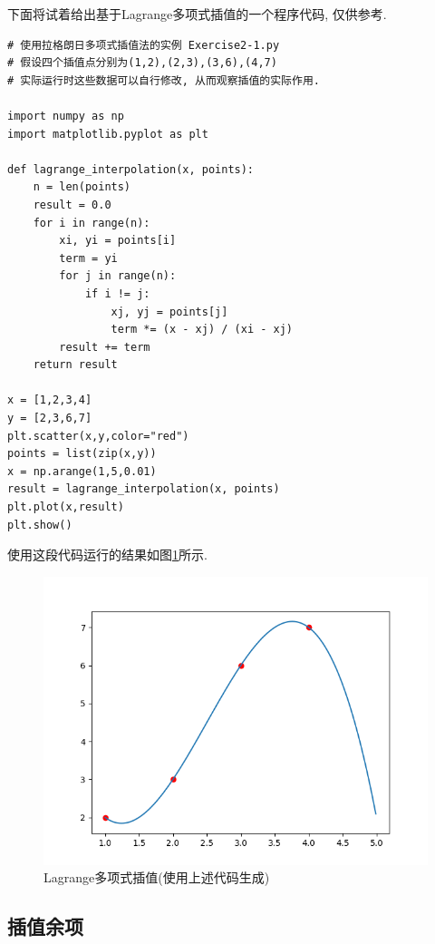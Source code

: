 下面将试着给出基于Lagrange多项式插值的一个程序代码, 仅供参考.

\begin{lstlisting}
# 使用拉格朗日多项式插值法的实例 Exercise2-1.py
# 假设四个插值点分别为(1,2),(2,3),(3,6),(4,7)
# 实际运行时这些数据可以自行修改, 从而观察插值的实际作用.

import numpy as np
import matplotlib.pyplot as plt

def lagrange_interpolation(x, points):
    n = len(points)
    result = 0.0
    for i in range(n):
        xi, yi = points[i]
        term = yi
        for j in range(n):
            if i != j:
                xj, yj = points[j]
                term *= (x - xj) / (xi - xj)
        result += term
    return result

x = [1,2,3,4]
y = [2,3,6,7]
plt.scatter(x,y,color="red")
points = list(zip(x,y))
x = np.arange(1,5,0.01)
result = lagrange_interpolation(x, points)
plt.plot(x,result)
plt.show()
\end{lstlisting}

使用这段代码运行的结果如图\ref{fig:Lagrange多项式插值}所示.

\begin{figure}[h]
    \centering
    \includegraphics[width=1\linewidth]{Chapter2/graph/python/Figure2-1.png}
    \caption{Lagrange多项式插值(使用上述代码生成)}
    \label{fig:Lagrange多项式插值}
\end{figure}

\subsection{插值余项}

